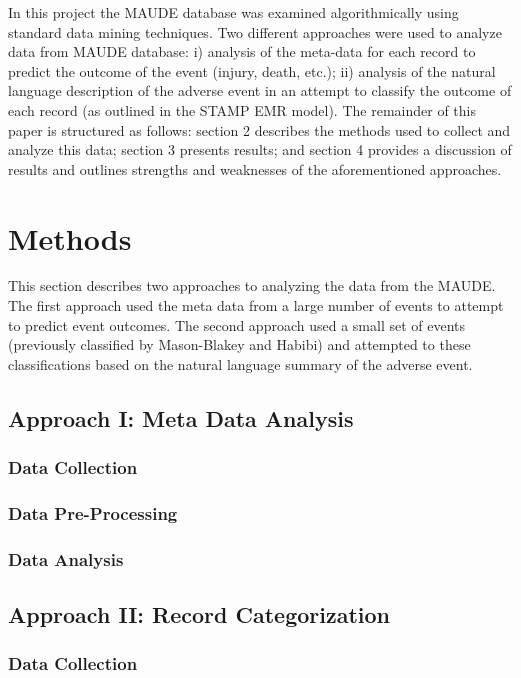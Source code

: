 \documentclass[11pt, notitlepage,abstracton,oneside]{article}   	%
\begin{document}
In this project the MAUDE database was examined algorithmically using standard data mining techniques. Two different approaches were used to analyze data from MAUDE database:  i) analysis of the meta-data for each record to predict the outcome of the event (injury, death, etc.); ii) analysis of the natural language description of the adverse event in an attempt to classify the outcome of each record (as outlined in the STAMP EMR model). The remainder of this paper is structured as follows: section 2 describes the methods used to collect and analyze this data; section 3 presents results; and section 4 provides a discussion of results and outlines strengths and weaknesses of the aforementioned approaches. 

\section{Methods}
This section describes two approaches to analyzing the data from the MAUDE. The first approach used the meta data from a large number of events to attempt to predict event outcomes. The second approach used a small set of events (previously classified by Mason-Blakey and Habibi) and attempted to 	 these classifications based on the natural language summary of the adverse event. 

\subsection{Approach I: Meta Data Analysis}

\subsubsection{Data Collection}

\subsubsection{Data Pre-Processing}

\subsubsection{Data Analysis}

\subsection{Approach II: Record Categorization}
\subsubsection{Data Collection}
\end{document}
